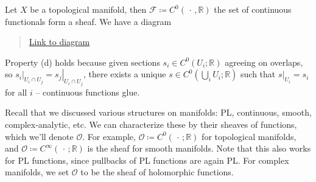 \begin{example}[?]

Let \(X\) be a topological manifold, then
\(\mathcal{F}\coloneqq C^0({\,\cdot\,}, {\mathbb{R}})\) the set of
continuous functionals form a sheaf. We have a diagram

\begin{center}
\end{center}

\begin{quote}
\href{https://q.uiver.app/?q=WzAsNCxbMCwwLCJVIl0sWzAsMiwiViJdLFsyLDAsIkNeMChVOyBcXFJSKSJdLFsyLDIsIkNeMChWOyBcXFJSKSJdLFsxLDAsIiIsMCx7InN0eWxlIjp7InRhaWwiOnsibmFtZSI6Imhvb2siLCJzaWRlIjoidG9wIn19fV0sWzIsMywiXFx0ZXh0e3Jlc3RyaWN0IGN0cy4gZnVuY3Rpb25zfSIsMCx7InN0eWxlIjp7InRhaWwiOnsibmFtZSI6Imhvb2siLCJzaWRlIjoidG9wIn0sImJvZHkiOnsibmFtZSI6ImRhc2hlZCJ9fX1dLFswLDIsIlxcbWF0aGNhbHtGfSJdLFsxLDMsIlxcbWF0aGNhbHtGfSIsMl1d}{Link
to diagram}
\end{quote}

Property (d) holds because given sections
\(s_i \in C^0(U_i; {\mathbb{R}})\) agreeing on overlaps, so
\({ \left.{{s_i}} \right|_{{U_i \cap U_j}} } = { \left.{{s_j}} \right|_{{U_i \cap U_j}} }\),
there exists a unique \(s\in C^0(\bigcup_i U_i; {\mathbb{R}})\) such
that \({ \left.{{s}} \right|_{{U_i}} } = s_i\) for all \(i\) --
continuous functions glue.

\end{example}

\begin{remark}

Recall that we discussed various structures on manifolds: PL,
continuous, smooth, complex-analytic, etc. We can characterize these by
their sheaves of functions, which we'll denote \({\mathcal{O}}\). For
example, \({\mathcal{O}}\coloneqq C^0({\,\cdot\,}; {\mathbb{R}})\) for
topological manifolds, and
\({\mathcal{O}}\coloneqq C^ \infty ({\,\cdot\,}; {\mathbb{R}})\) is the
sheaf for smooth manifolds. Note that this also works for PL functions,
since pullbacks of PL functions are again PL. For complex manifolds, we
set \({\mathcal{O}}\) to be the sheaf of holomorphic functions.

\end{remark}

